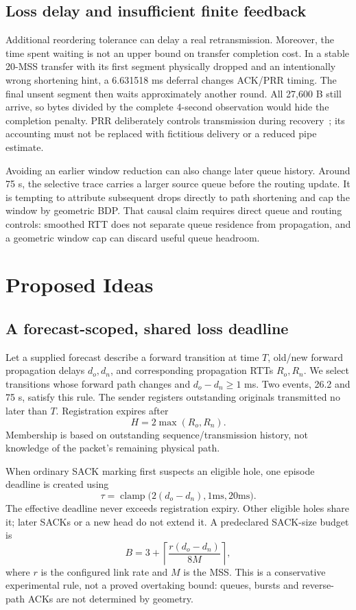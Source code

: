 \documentclass[conference]{IEEEtran}
\begin{document}
\subsection{Loss delay and insufficient finite feedback}
Additional reordering tolerance can delay a real retransmission.
Moreover, the time spent waiting is not an upper bound on transfer
completion cost. In a stable 20-MSS transfer with its first segment
physically dropped and an intentionally wrong shortening hint, a
6.631518 ms deferral changes ACK/PRR timing. The final unsent segment then
waits approximately another round. All 27,600 B still arrive, so
bytes divided by the complete 4-second observation would hide the
completion penalty. PRR deliberately controls transmission during
recovery~\cite{prr}; its accounting must not be replaced with fictitious
delivery or a reduced pipe estimate.

Avoiding an earlier window reduction can also change later queue
history. Around 75 s, the selective trace carries a larger source queue
before the routing update. It is tempting to attribute subsequent drops
directly to path shortening and cap the window by geometric BDP. That
causal claim requires direct queue and routing controls: smoothed RTT
does not separate queue residence from propagation, and a geometric
window cap can discard useful queue headroom.

\section{Proposed Ideas}
\subsection{A forecast-scoped, shared loss deadline}
Let a supplied forecast describe a forward transition at time $T$,
old/new forward propagation delays $d_o, d_n$, and corresponding
propagation RTTs $R_o, R_n$. We select transitions whose forward path
changes and $d_o-d_n\ge 1$ ms. Two events, 26.2 and 75 s, satisfy this rule.
The sender registers outstanding originals transmitted no later than $T$.
Registration expires after
\begin{equation}
 H=2\max(R_o, R_n).
\end{equation}
Membership is based on outstanding sequence/transmission history, not
knowledge of the packet's remaining physical path.

When ordinary SACK marking first suspects an eligible hole, one episode
deadline is created using
\begin{equation}
 \tau=\operatorname{clamp}\bigl(2(d_o-d_n), 1\mathrm{ms}, 20\mathrm{ms}\bigr).
\end{equation}
The effective deadline never exceeds registration expiry. Other eligible
holes share it; later SACKs or a new head do not extend it. A predeclared
SACK-size budget is
\begin{equation}
 B=3+\left\lceil\frac{r(d_o-d_n)}{8 M}\right\rceil,
\end{equation}
where $r$ is the configured link rate and $M$ is the MSS. This is a
conservative experimental rule, not a proved overtaking bound: queues,
bursts and reverse-path ACKs are not determined by geometry.
\end{document}
